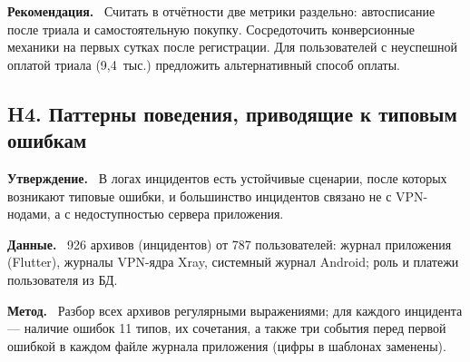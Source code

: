 \documentclass[11pt,a4paper]{article}
\newcommand{\hblock}[1]{\par\smallskip\noindent\textbf{#1.}~}
\begin{document}
\hblock{Рекомендация} Считать в отчётности две метрики раздельно: автосписание после триала и самостоятельную покупку. Сосредоточить конверсионные механики на первых сутках после регистрации. Для пользователей с неуспешной оплатой триала (9,4~тыс.) предложить альтернативный способ оплаты.

\subsection{H4. Паттерны поведения, приводящие к типовым ошибкам}

\hblock{Утверждение} В логах инцидентов есть устойчивые сценарии, после которых возникают типовые ошибки, и большинство инцидентов связано не с VPN-нодами, а с недоступностью сервера приложения.

\hblock{Данные} 926 архивов (инцидентов) от 787 пользователей: журнал приложения (Flutter), журналы VPN-ядра Xray, системный журнал Android; роль и платежи пользователя из БД.

\hblock{Метод} Разбор всех архивов регулярными выражениями; для каждого инцидента --- наличие ошибок 11 типов, их сочетания, а также три события перед первой ошибкой в каждом файле журнала приложения (цифры в шаблонах заменены).
\end{document}
